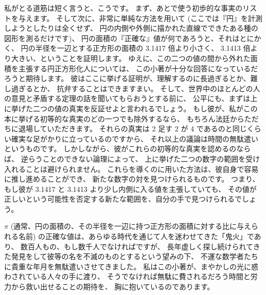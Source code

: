 \documentclass{article}
\begin{document}
私がとる道筋は短く言うと、こうです。
まず、あとで使う初歩的な事実のリストを与えます。
そして次に、非常に単純な方法を用いて
(ここでは『円』を計測しようとしたりは全くせず、
円の内側や外側に描かれた直線でできたある種の図形を測るだけです)、
円の面積の『正確な』値が何であろうと、それはとにかく、
円の半径を一辺とする正方形の面積の 3.1417 倍より小さく、
3.1413 倍より大きい、ということを証明します。
ゆえに、この二つの値の間から外れた面積を主張する円正方形化人については、
この小著が十分な回答になっているだろうと期待します。
彼はここに挙げる証明が、理解するのに長過ぎるとか、難し過ぎるとか、
抗弁することはできますまい。
そして、世界中のほとんどの人の意見と矛盾する定理の話を聞いてもらおうとする前に、
公平にも、まずは上に挙げた二つの値の真実を反証せよと言われるでしょう。
もし彼が、私がこの本に挙げる初等的な真実のどの一つでも除外するなら、
もちろん法廷からただちに退場していただきます。
それらの真実は 2 足す 2 が 4 であるのと同じくらい確実な足がかりに立っているのですから、
それ以上の議論は時間の無駄遣いというものです。
しかしながら、彼がこれらの初等的な真実を認めるのならば、
逆らうことのできない論理によって、
上に挙げた二つの数字の範囲を受け入れることは避けられません。
これらを導くのに用いた方法は、彼自身で容易に推し進めることができ、
新たな数字の対を見つけられるものです。
つまり、もし彼が 3.1417 と 3.1413 より少し内側に入る値を主張していても、
その値が正しいという可能性を否定する新たな範囲を、自分の手で見つけられるでしょう。

 $\pi$
(通常、円の面積の、その半径を一辺に持つ正方形の面積に対する比に与えられる名前)
の正確な値は、あらゆる時代を通じて人を迷わせてきた「鬼火」であり、
数百人もの、もし数千人でなければですが、
長年虚しく探し続けられてきた発見をして彼等の名を不滅のものとするという望みの下、
不運な数学者たちに貴重な年月を無駄遣いさせてきました。
私はこの小著が、まやかしの光に惑わされている人々の手に渡り、
そうでなければ無駄に費されるだろう時間と労力から救い出せることの期待を、
胸に抱いているのであります。
\end{document}
